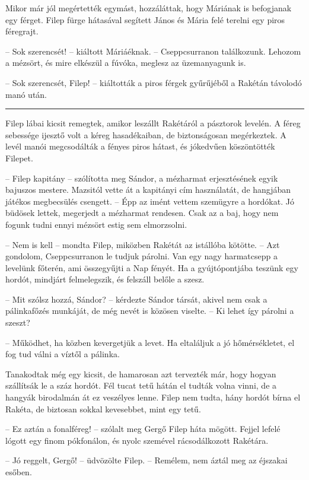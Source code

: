 \documentclass[10pt]{memoir}
\renewcommand{\pfbreakdisplay}{\bigskip \ding{166} \bigskip}
\newcommand{\secbreak}{\fancybreak{\pfbreakdisplay}\indent}
\begin{document}
Mikor már jól megértették egymást, hozzáláttak, hogy Máriának is befogjanak egy
férget. Filep fürge hátasával segített János és Mária felé terelni egy piros
féregrajt.

-- Sok szerencsét! -- kiáltott Máriáéknak. -- Cseppcsurranon találkozunk.
Lehozom a mézsört, és mire elkészül a fúvóka, meglesz az üzemanyagunk is.

-- Sok szerencsét, Filep! -- kiáltották a piros férgek gyűrűjéből a Rakétán
távolodó manó után.

\secbreak

Filep lábai kicsit remegtek, amikor leszállt Rakétáról a pásztorok levelén. A
féreg sebessége ijesztő volt a kéreg hasadékaiban, de biztonságosan
megérkeztek. A levél manói megcsodálták a fényes piros hátast, és jókedvűen
köszöntötték Filepet.

-- Filep kapitány -- szólította meg Sándor, a mézharmat erjesztésének egyik
bajuszos mestere. Mazsitól vette át a kapitányi cím használatát, de hangjában
játékos megbecsülés csengett. -- Épp az imént vettem szemügyre a hordókat. Jó
büdösek lettek, megerjedt a mézharmat rendesen. Csak az a baj, hogy nem fogunk
tudni ennyi mézsört estig sem elmorzsolni.

-- Nem is kell -- mondta Filep, miközben Rakétát az istállóba kötötte. --
Azt gondolom, Cseppcsurranon le tudjuk párolni. Van egy nagy harmatcsepp a
levelünk főterén, ami összegyűjti a Nap fényét. Ha a gyújtópontjába teszünk egy
hordót, mindjárt felmelegszik, és felszáll belőle a szesz.

-- Mit szólsz hozzá, Sándor? -- kérdezte Sándor társát, akivel nem csak a
pálinkafőzés munkáját, de még nevét is közösen viselte. -- Ki lehet így
párolni a szeszt?

-- Működhet, ha közben kevergetjük a levet. Ha eltaláljuk a jó hőmérsékletet,
el fog tud válni a víztől a pálinka.

Tanakodtak még egy kicsit, de hamarosan azt tervezték már, hogy hogyan
szállítsák le a száz hordót. Fél tucat tetű hátán el tudták volna vinni, de a
hangyák birodalmán át ez veszélyes lenne. Filep nem tudta, hány hordót bírna el
Rakéta, de biztosan sokkal kevesebbet, mint egy tetű.

-- Ez aztán a fonalféreg! -- szólalt meg Gergő Filep háta mögött. Fejjel
lefelé lógott egy finom pókfonálon, és nyolc szemével rácsodálkozott Rakétára.

-- Jó reggelt, Gergő! -- üdvözölte Filep. -- Remélem, nem áztál meg az
éjszakai esőben.
\end{document}
